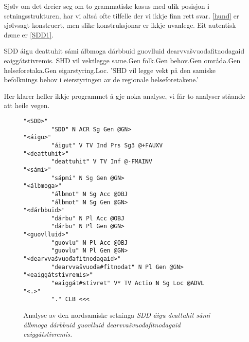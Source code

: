 \documentclass[a4paper,norsk]{article}
\begin{document}
Sjølv om det dreier seg om to grammatiske kasus med ulik posisjon i setningsstrukturen, har vi altså ofte tilfelle der vi ikkje finn rett svar. \ref{hund} er sjølvsagt konstruert, men slike konstruksjonar er ikkje uvanlege. Eit autentisk døme er \ref{SDD1}. %

 \begin{example}\label{SDD1}
\gll SDD áigu deattuhit sámi álbmoga dárbbuid guovlluid dearvvašvuođafitnodagaid eaiggátstivremis.
      SHD vil vektlegge same.Gen folk.Gen behov.Gen områda.Gen helseforetaka.Gen eigarstyring.Loc.
\glt  'SHD vil legge vekt på den samiske befolknings behov i eierstyringen av de regionale helseforetakene.'
\glend
\end{example}

Her klarer heller ikkje programmet å gje noka analyse, vi får to analyser ståande att heile vegen. %

\begin{figure}[htbp]
\begin{center}
\begin{verbatim}
"<SDD>"
        "SDD" N ACR Sg Gen @GN>
"<áigu>"
        "áigut" V TV Ind Prs Sg3 @+FAUXV
"<deattuhit>"
        "deattuhit" V TV Inf @-FMAINV
"<sámi>"
        "sápmi" N Sg Gen @GN>
"<álbmoga>"
        "álbmot" N Sg Acc @OBJ
        "álbmot" N Sg Gen @GN>
"<dárbbuid>"
        "dárbu" N Pl Acc @OBJ
        "dárbu" N Pl Gen @GN>
"<guovlluid>"
        "guovlu" N Pl Acc @OBJ
        "guovlu" N Pl Gen @GN>
"<dearvvašvuođafitnodagaid>"
        "dearvvašvuođa#fitnodat" N Pl Gen @GN>
"<eaiggátstivremis>"
        "eaiggát#stivret" V* TV Actio N Sg Loc @ADVL
"<.>"
        "." CLB <<<
\end{verbatim}
\caption{Analyse av den nordsamiske setninga \textit{SDD áigu deattuhit sámi álbmoga dárbbuid guovlluid dearvvašvuođafitnodagaid eaiggátstivremis.}}
\label{SDD1-a}
\end{center}
\end{figure}
\end{document}
